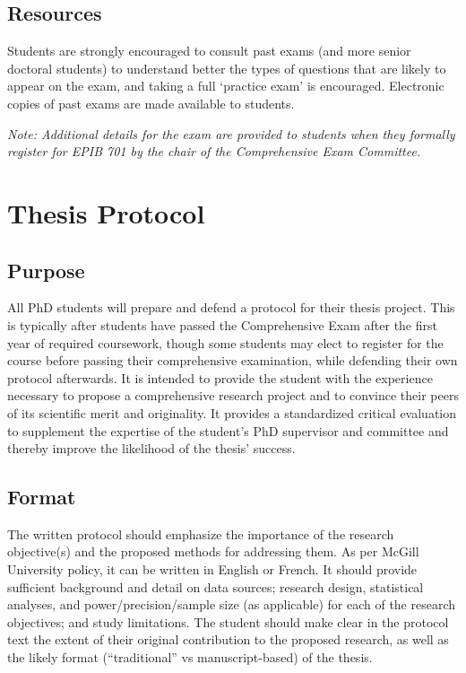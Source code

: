 \documentclass[
  letterpaper,
  DIV=11,
  numbers=noendperiod]{scrreprt}
\begin{document}
\section{Resources}\label{resources}

Students are strongly encouraged to consult past exams (and more senior
doctoral students) to understand better the types of questions that are
likely to appear on the exam, and taking a full `practice exam' is
encouraged. Electronic copies of past exams are made available to
students.

\emph{Note: Additional details for the exam are provided to students
when they formally register for EPIB 701 by the chair of the
Comprehensive Exam Committee.}


\chapter{Thesis Protocol}\label{thesis-protocol}

\section{Purpose}\label{purpose-1}

All PhD students will prepare and defend a protocol for their thesis
project. This is typically after students have passed the Comprehensive
Exam after the first year of required coursework, though some students
may elect to register for the course before passing their comprehensive
examination, while defending their own protocol afterwards. It is
intended to provide the student with the experience necessary to propose
a comprehensive research project and to convince their peers of its
scientific merit and originality. It provides a standardized critical
evaluation to supplement the expertise of the student's PhD supervisor
and committee and thereby improve the likelihood of the thesis' success.

\section{Format}\label{format}

The written protocol should emphasize the importance of the research
objective(s) and the proposed methods for addressing them. As per McGill
University policy, it can be written in English or French. It should
provide sufficient background and detail on data sources; research
design, statistical analyses, and power/precision/sample size (as
applicable) for each of the research objectives; and study limitations.
The student should make clear in the protocol text the extent of their
original contribution to the proposed research, as well as the likely
format (``traditional'' vs manuscript-based) of the thesis.
\end{document}
